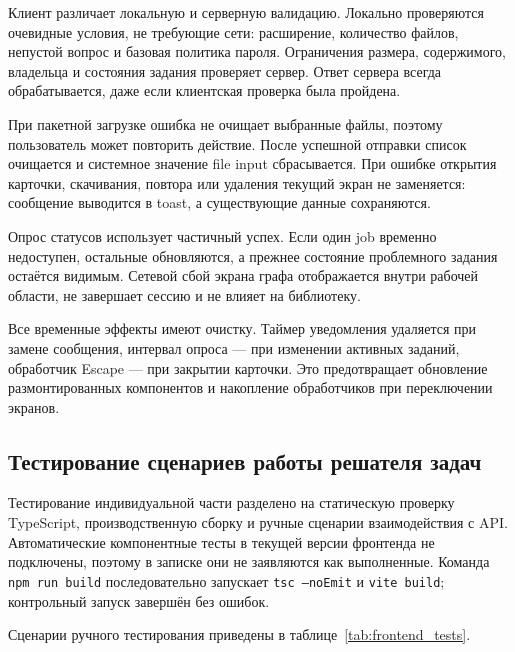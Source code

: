 Клиент различает локальную и серверную валидацию. Локально проверяются очевидные условия, не требующие сети: расширение, количество файлов, непустой вопрос и базовая политика пароля. Ограничения размера, содержимого, владельца и состояния задания проверяет сервер. Ответ сервера всегда обрабатывается, даже если клиентская проверка была пройдена.

При пакетной загрузке ошибка не очищает выбранные файлы, поэтому пользователь может повторить действие. После успешной отправки список очищается и системное значение file input сбрасывается. При ошибке открытия карточки, скачивания, повтора или удаления текущий экран не заменяется: сообщение выводится в toast, а существующие данные сохраняются.

Опрос статусов использует частичный успех. Если один job временно недоступен, остальные обновляются, а прежнее состояние проблемного задания остаётся видимым. Сетевой сбой экрана графа отображается внутри рабочей области, не завершает сессию и не влияет на библиотеку.

Все временные эффекты имеют очистку. Таймер уведомления удаляется при замене сообщения, интервал опроса --- при изменении активных заданий, обработчик Escape --- при закрытии карточки. Это предотвращает обновление размонтированных компонентов и накопление обработчиков при переключении экранов.

\subsection{Тестирование сценариев работы решателя задач}

Тестирование индивидуальной части разделено на статическую проверку TypeScript, производственную сборку и ручные сценарии взаимодействия с API. Автоматические компонентные тесты в текущей версии фронтенда не подключены, поэтому в записке они не заявляются как выполненные. Команда \texttt{npm run build} последовательно запускает \texttt{tsc --noEmit} и \texttt{vite build}; контрольный запуск завершён без ошибок.

Сценарии ручного тестирования приведены в таблице~\ref{tab:frontend_tests}.


